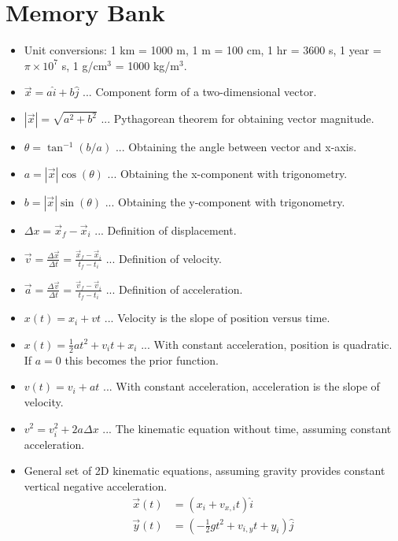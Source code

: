 \documentclass[10pt]{article}
\begin{document}
\maketitle

\section{Memory Bank}

\begin{itemize}
\item Unit conversions: 1 km = 1000 m, 1 m = 100 cm, 1 hr = 3600 s, 1 year = $\pi \times 10^7$ s, 1 g/cm$^3$ = 1000 kg/m$^3$.
\item $\vec{x} = a \hat{i} + b\hat{j}$ ... Component form of a two-dimensional vector.
\item $|\vec{x}| = \sqrt{a^2+b^2}$ ... Pythagorean theorem for obtaining vector magnitude.
\item $\theta = \tan^{-1}(b/a)$ ... Obtaining the angle between vector and x-axis.
\item $a = |\vec{x}|\cos(\theta)$ ... Obtaining the x-component with trigonometry.
\item $b = |\vec{x}|\sin(\theta)$ ... Obtaining the y-component with trigonometry.
\item $\Delta x = \vec{x}_f - \vec{x}_i$ ... Definition of displacement.
\item $\vec{v} = \frac{\Delta \vec{x}}{\Delta t} = \frac{\vec{x}_f - \vec{x}_i}{t_f-t_i}$ ... Definition of velocity.
\item $\vec{a} = \frac{\Delta \vec{v}}{\Delta t} = \frac{\vec{v}_f - \vec{v}_i}{t_f-t_i}$ ... Definition of acceleration.
\item $x(t) = x_i + v t$ ... Velocity is the slope of position versus time.
\item $x(t) = \frac{1}{2} a t^2 + v_i t + x_i$ ... With constant acceleration, position is quadratic.  If $a=0$ this becomes the prior function.
\item $v(t) = v_i + a t$ ... With constant acceleration, acceleration is the slope of velocity.
\item $v^2 = v_i^2 + 2 a \Delta x$ ... The kinematic equation without time, assuming constant acceleration.
\item General set of 2D kinematic equations, assuming gravity provides constant vertical negative acceleration.
\begin{align}
\vec{x}(t) &= (x_i + v_{x,i} t) \hat{i} \\
\vec{y}(t) &= (-\frac{1}{2}g t^2 + v_{i,y} t + y_i) \hat{j} \\

\end{align}
\end{itemize}
\end{document}
